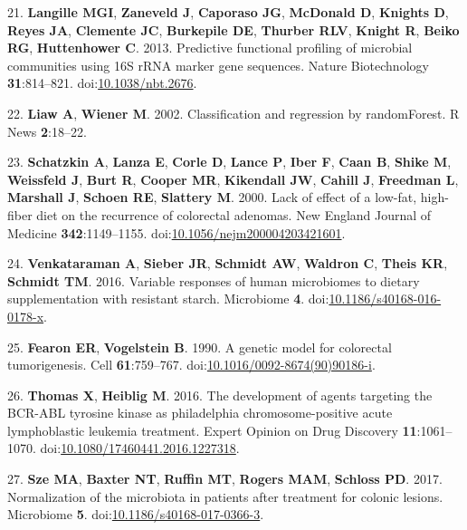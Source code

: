 \documentclass[11pt,]{article}
\begin{document}
\hypertarget{ref-Langille2013}{}
21. \textbf{Langille MGI}, \textbf{Zaneveld J}, \textbf{Caporaso JG},
\textbf{McDonald D}, \textbf{Knights D}, \textbf{Reyes JA},
\textbf{Clemente JC}, \textbf{Burkepile DE}, \textbf{Thurber RLV},
\textbf{Knight R}, \textbf{Beiko RG}, \textbf{Huttenhower C}. 2013.
Predictive functional profiling of microbial communities using 16S rRNA
marker gene sequences. Nature Biotechnology \textbf{31}:814--821.
doi:\href{https://doi.org/10.1038/nbt.2676}{10.1038/nbt.2676}.

\hypertarget{ref-randomforest_citation_2002}{}
22. \textbf{Liaw A}, \textbf{Wiener M}. 2002. Classification and
regression by randomForest. R News \textbf{2}:18--22.

\hypertarget{ref-Schatzkin2000}{}
23. \textbf{Schatzkin A}, \textbf{Lanza E}, \textbf{Corle D},
\textbf{Lance P}, \textbf{Iber F}, \textbf{Caan B}, \textbf{Shike M},
\textbf{Weissfeld J}, \textbf{Burt R}, \textbf{Cooper MR},
\textbf{Kikendall JW}, \textbf{Cahill J}, \textbf{Freedman L},
\textbf{Marshall J}, \textbf{Schoen RE}, \textbf{Slattery M}. 2000. Lack
of effect of a low-fat, high-fiber diet on the recurrence of colorectal
adenomas. New England Journal of Medicine \textbf{342}:1149--1155.
doi:\href{https://doi.org/10.1056/nejm200004203421601}{10.1056/nejm200004203421601}.

\hypertarget{ref-scfa_measures_venkataraman2016}{}
24. \textbf{Venkataraman A}, \textbf{Sieber JR}, \textbf{Schmidt AW},
\textbf{Waldron C}, \textbf{Theis KR}, \textbf{Schmidt TM}. 2016.
Variable responses of human microbiomes to dietary supplementation with
resistant starch. Microbiome \textbf{4}.
doi:\href{https://doi.org/10.1186/s40168-016-0178-x}{10.1186/s40168-016-0178-x}.

\hypertarget{ref-Fearon1990}{}
25. \textbf{Fearon ER}, \textbf{Vogelstein B}. 1990. A genetic model for
colorectal tumorigenesis. Cell \textbf{61}:759--767.
doi:\href{https://doi.org/10.1016/0092-8674(90)90186-i}{10.1016/0092-8674(90)90186-i}.

\hypertarget{ref-Thomas2016}{}
26. \textbf{Thomas X}, \textbf{Heiblig M}. 2016. The development of
agents targeting the BCR-ABL tyrosine kinase as philadelphia
chromosome-positive acute lymphoblastic leukemia treatment. Expert
Opinion on Drug Discovery \textbf{11}:1061--1070.
doi:\href{https://doi.org/10.1080/17460441.2016.1227318}{10.1080/17460441.2016.1227318}.

\hypertarget{ref-normalization_Sze2017}{}
27. \textbf{Sze MA}, \textbf{Baxter NT}, \textbf{Ruffin MT},
\textbf{Rogers MAM}, \textbf{Schloss PD}. 2017. Normalization of the
microbiota in patients after treatment for colonic lesions. Microbiome
\textbf{5}.
doi:\href{https://doi.org/10.1186/s40168-017-0366-3}{10.1186/s40168-017-0366-3}.
\end{document}
